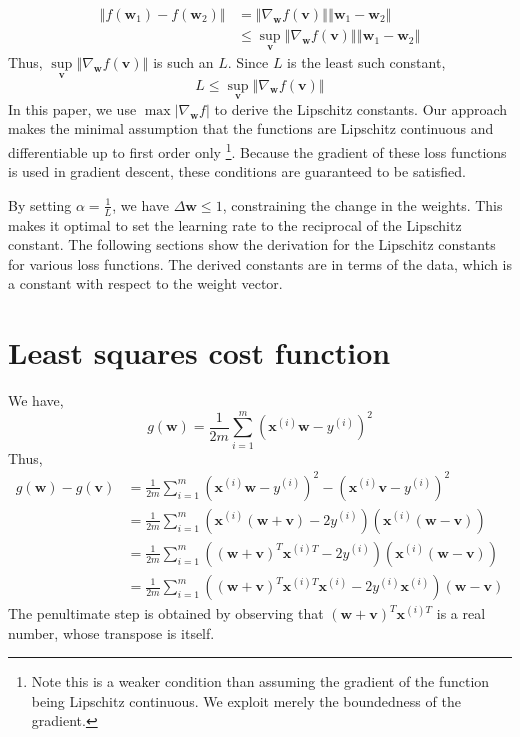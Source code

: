 \documentclass{article}
\begin{document}
\[
    \begin{aligned}
        \left\Vert f(\textbf{w}_1) - f(\textbf{w}_2) \right\Vert &= \left\Vert \nabla_{\textbf{w}} f(\textbf{v}) \right\Vert \left\Vert \textbf{w}_1-\textbf{w}_2 \right\Vert \\
        &\leq \sup\limits_{\textbf{v}} \left\Vert \nabla_{\textbf{w}} f(\textbf{v}) \right\Vert \left\Vert \textbf{w}_1-\textbf{w}_2 \right\Vert
    \end{aligned}
\]
Thus, $\sup\limits_{\textbf{v}} \left\Vert \nabla_{\textbf{w}} f(\textbf{v}) \right\Vert$ is such an $L$. Since $L$ is the least such constant, 
\[
    L \leq \sup\limits_{\textbf{v}} \left\Vert \nabla_{\textbf{w}} f(\textbf{v}) \right\Vert
\]
In this paper, we use $\max |\nabla_{\textbf{w}} f|$ to derive the Lipschitz constants. Our approach makes the minimal assumption that the functions are Lipschitz continuous and differentiable up to first order only \footnote{Note this is a weaker condition than assuming the gradient of the function being Lipschitz continuous. We exploit merely the boundedness of the gradient.}. Because the gradient of these loss functions is used in gradient descent, these conditions are guaranteed to be satisfied.

By setting $\alpha = \frac{1}{L}$, we have $\Delta \textbf{w} \leq 1$, constraining the change in the weights. This makes it optimal to set the learning rate to the reciprocal of the Lipschitz constant. The following sections show the derivation for the Lipschitz constants for various loss functions. The derived constants are in terms of the data, which is a constant with respect to the weight vector.


\section{Least squares cost function} \label{lstsq}
We have,
\[
    g(\textbf{w}) = \frac{1}{2m}\sum\limits_{i=1}^m \left(\textbf{x}^{(i)} \textbf{w} - y^{(i)}\right)^2
\]
Thus,
\[
    \begin{aligned}
        g(\textbf{w}) - g(\textbf{v}) &= \frac{1}{2m}\sum\limits_{i=1}^m \left(\textbf{x}^{(i)} \textbf{w} - y^{(i)}\right)^2 - \left(\textbf{x}^{(i)} \textbf{v} - y^{(i)}\right)^2 \\
        &= \frac{1}{2m}\sum\limits_{i=1}^m \left( \textbf{x}^{(i)}(\textbf{w}+\textbf{v}) - 2y^{(i)}\right) \left( \textbf{x}^{(i)} (\textbf{w}-\textbf{v}) \right) \\
        &= \frac{1}{2m}\sum\limits_{i=1}^m \left( (\textbf{w}+\textbf{v})^T \textbf{x}^{(i)T} - 2y^{(i)}\right) \left( \textbf{x}^{(i)} (\textbf{w}-\textbf{v}) \right) \\
        &= \frac{1}{2m}\sum\limits_{i=1}^m \left( (\textbf{w} + \textbf{v})^T \textbf{x}^{(i)T}\textbf{x}^{(i)} - 2y^{(i)}\textbf{x}^{(i)} \right) (\textbf{w}-\textbf{v}) 
    \end{aligned}
\]
The penultimate step is obtained by observing that $(\textbf{w}+\textbf{v})^T \textbf{x}^{(i)T}$ is a real number, whose transpose is itself.
\end{document}
